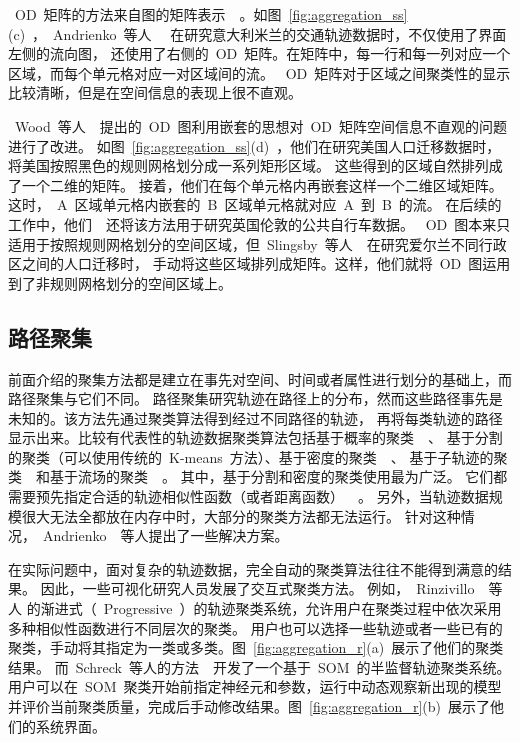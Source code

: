 \documentclass[12pt,twocolumn]{article}
\begin{document}
~OD~矩阵的方法来自图的矩阵表示~\citep{HenryF2006}~。如图~\ref{fig:aggregation_ss}(c)~，~Andrienko~等人
~\citep{AndrienkoA2008b}~在研究意大利米兰的交通轨迹数据时，不仅使用了界面左侧的流向图，
还使用了右侧的~OD~矩阵。在矩阵中，每一行和每一列对应一个区域，而每个单元格对应一对区域间的流。
~OD~矩阵对于区域之间聚类性的显示比较清晰，但是在空间信息的表现上很不直观。

~Wood~等人~\citep{WoodDS2010}~提出的~OD~图利用嵌套的思想对~OD~矩阵空间信息不直观的问题进行了改进。
如图~\ref{fig:aggregation_ss}(d)~，他们在研究美国人口迁移数据时，将美国按照黑色的规则网格划分成一系列矩形区域。
这些得到的区域自然排列成了一个二维的矩阵。
接着，他们在每个单元格内再嵌套这样一个二维区域矩阵。这时，~A~区域单元格内嵌套的~B~区域单元格就对应~A~到~B~的流。
在后续的工作中，他们~\citep{WoodSD2011}~还将该方法用于研究英国伦敦的公共自行车数据。
~OD~图本来只适用于按照规则网格划分的空间区域，但~Slingsby~等人~\citep{SlingsbyKDW2012}~在研究爱尔兰不同行政区之间的人口迁移时，
手动将这些区域排列成矩阵。这样，他们就将~OD~图运用到了非规则网格划分的空间区域上。

\subsection{路径聚集}
\label{subsection:aggregation_r}

前面介绍的聚集方法都是建立在事先对空间、时间或者属性进行划分的基础上，而路径聚集与它们不同。
路径聚集研究轨迹在路径上的分布，然而这些路径事先是未知的。该方法先通过聚类算法得到经过不同路径的轨迹，
再将每类轨迹的路径显示出来。比较有代表性的轨迹数据聚类算法包括基于概率的聚类~\citep{GaffneyS1999}~、
基于分割的聚类（可以使用传统的~K-means~方法）、基于密度的聚类~\citep{EsterKSX1996}~、
基于子轨迹的聚类~\citep{LeeHW2007}~和基于流场的聚类~\citep{FerreiraKSS2013}~。
其中，基于分割和密度的聚类使用最为广泛。
它们都需要预先指定合适的轨迹相似性函数（或者距离函数）~\citep{PelekisAAKMT2012}~。
另外，当轨迹数据规模很大无法全都放在内存中时，大部分的聚类方法都无法运行。
针对这种情况，~Andrienko~\citep{AndrienkoARNPG2009}~等人提出了一些解决方案。

在实际问题中，面对复杂的轨迹数据，完全自动的聚类算法往往不能得到满意的结果。
因此，一些可视化研究人员发展了交互式聚类方法。
例如，~Rinzivillo~\citep{RinzivilloPNGAA2008}~等人
的渐进式（~Progressive~）的轨迹聚类系统，允许用户在聚类过程中依次采用多种相似性函数进行不同层次的聚类。
用户也可以选择一些轨迹或者一些已有的聚类，手动将其指定为一类或多类。图~\ref{fig:aggregation_r}(a)~展示了他们的聚类结果。
而~Schreck~等人的方法~\citep{SchreckBTK2008}~开发了一个基于~SOM~的半监督轨迹聚类系统。
用户可以在~SOM~聚类开始前指定神经元和参数，运行中动态观察新出现的模型
并评价当前聚类质量，完成后手动修改结果。图~\ref{fig:aggregation_r}(b)~展示了他们的系统界面。
\end{document}
